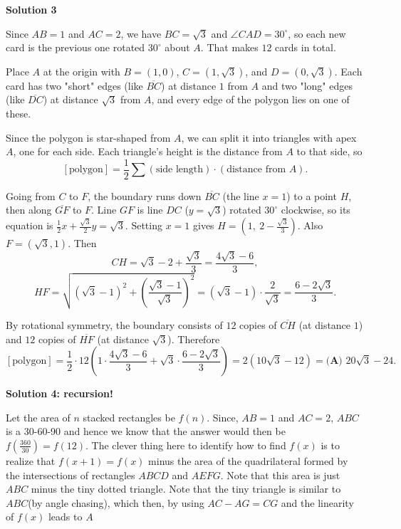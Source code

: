 \begin{enumerate}
 



\textbf{Solution 3}

Since $AB = 1$ and $AC = 2$, we have $BC = \sqrt{3}$ and $\angle CAD = 30^\circ$, so each new card is the previous one rotated $30^\circ$ about $A$. That makes $12$ cards in total.

 Place $A$ at the origin with $B = (1, 0)$, $C = (1, \sqrt{3})$, and $D = (0, \sqrt{3})$. Each card has two "short" edges (like $\overline{BC}$) at distance $1$ from $A$ and two "long" edges (like $\overline{DC}$) at distance $\sqrt{3}$ from $A$, and every edge of the polygon lies on one of these.

 Since the polygon is star-shaped from $A$, we can split it into triangles with apex $A$, one for each side. Each triangle's height is the distance from $A$ to that side, so
 \[[\text{polygon}] = \frac{1}{2}\sum (\text{side length})\cdot(\text{distance from } A).\]

 Going from $C$ to $F$, the boundary runs down $\overline{BC}$ (the line $x = 1$) to a point $H$, then along $\overline{GF}$ to $F$. Line $GF$ is line $DC$ ($y = \sqrt{3}$) rotated $30^\circ$ clockwise, so its equation is $\frac{1}{2}x + \frac{\sqrt{3}}{2}y = \sqrt{3}$. Setting $x = 1$ gives $H = \left(1,\ 2 - \frac{\sqrt{3}}{3}\right)$. Also $F = (\sqrt{3}, 1)$. Then
 \[CH = \sqrt{3} - 2 + \frac{\sqrt{3}}{3} = \frac{4\sqrt{3} - 6}{3},\]
 \[HF = \sqrt{(\sqrt{3}-1)^2 + \left(\frac{\sqrt{3}-1}{\sqrt{3}}\right)^2} = (\sqrt{3}-1)\cdot\frac{2}{\sqrt{3}} = \frac{6 - 2\sqrt{3}}{3}.\]

 By rotational symmetry, the boundary consists of $12$ copies of $\overline{CH}$ (at distance $1$) and $12$ copies of $\overline{HF}$ (at distance $\sqrt{3}$). Therefore
 \[[\text{polygon}] = \frac{1}{2}\cdot 12\left(1\cdot\frac{4\sqrt{3}-6}{3} + \sqrt{3}\cdot\frac{6-2\sqrt{3}}{3}\right) = 2\left(10\sqrt{3} - 12\right) = \boxed{\textbf{(A) }20\sqrt{3}-24}.\]




\textbf{Solution 4: recursion!}

Let the area of $n$ stacked rectangles be $f(n)$. Since, $AB=1$ and $AC=2$, $ABC$ is a 30-60-90 and hence we know that the answer would then be $f(\frac{360}{30})=f(12)$. The clever thing here to identify how to find $f(x)$ is to realize that $f(x+1) = f(x)$ minus the area of the quadrilateral formed by the intersections of rectangles $ABCD$ and $AEFG$. Note that this area is just $ABC$ minus the tiny dotted triangle. Note that the tiny triangle is similar to $ABC$(by angle chasing), which then, by using $AC-AG=CG$ and the linearity of $f(x)$ leads to $\boxed{A}$


\end{enumerate}
